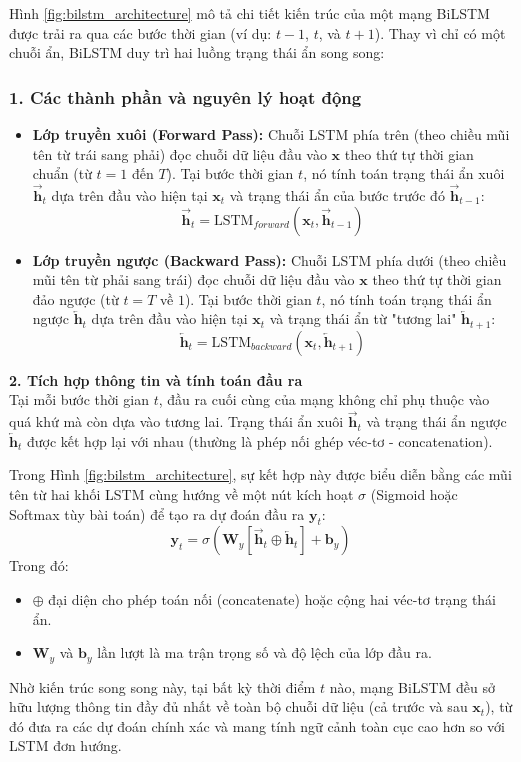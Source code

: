 Hình \ref{fig:bilstm_architecture} mô tả chi tiết kiến trúc của một mạng BiLSTM được trải ra qua các bước thời gian (ví dụ: $t-1$, $t$, và $t+1$). Thay vì chỉ có một chuỗi ẩn, BiLSTM duy trì hai luồng trạng thái ẩn song song:

\subsubsection*{1. Các thành phần và nguyên lý hoạt động}
\begin{itemize}
    \item \textbf{Lớp truyền xuôi (Forward Pass):} Chuỗi LSTM phía trên (theo chiều mũi tên từ trái sang phải) đọc chuỗi dữ liệu đầu vào $\mathbf{x}$ theo thứ tự thời gian chuẩn (từ $t=1$ đến $T$). Tại bước thời gian $t$, nó tính toán trạng thái ẩn xuôi $\overrightarrow{\mathbf{h}}_t$ dựa trên đầu vào hiện tại $\mathbf{x}_t$ và trạng thái ẩn của bước trước đó $\overrightarrow{\mathbf{h}}_{t-1}$:
    $$ \overrightarrow{\mathbf{h}}_t = \text{LSTM}_{forward}(\mathbf{x}_t, \overrightarrow{\mathbf{h}}_{t-1}) $$

    \item \textbf{Lớp truyền ngược (Backward Pass):} Chuỗi LSTM phía dưới (theo chiều mũi tên từ phải sang trái) đọc chuỗi dữ liệu đầu vào $\mathbf{x}$ theo thứ tự thời gian đảo ngược (từ $t=T$ về $1$). Tại bước thời gian $t$, nó tính toán trạng thái ẩn ngược $\overleftarrow{\mathbf{h}}_t$ dựa trên đầu vào hiện tại $\mathbf{x}_t$ và trạng thái ẩn từ "tương lai" $\overleftarrow{\mathbf{h}}_{t+1}$:
    $$ \overleftarrow{\mathbf{h}}_t = \text{LSTM}_{backward}(\mathbf{x}_t, \overleftarrow{\mathbf{h}}_{t+1}) $$
\end{itemize}

\textbf{2. Tích hợp thông tin và tính toán đầu ra} \\
Tại mỗi bước thời gian $t$, đầu ra cuối cùng của mạng không chỉ phụ thuộc vào quá khứ mà còn dựa vào tương lai. Trạng thái ẩn xuôi $\overrightarrow{\mathbf{h}}_t$ và trạng thái ẩn ngược $\overleftarrow{\mathbf{h}}_t$ được kết hợp lại với nhau (thường là phép nối ghép véc-tơ - concatenation). 

Trong Hình \ref{fig:bilstm_architecture}, sự kết hợp này được biểu diễn bằng các mũi tên từ hai khối LSTM cùng hướng về một nút kích hoạt $\sigma$ (Sigmoid hoặc Softmax tùy bài toán) để tạo ra dự đoán đầu ra $\mathbf{y}_t$:
$$ \mathbf{y}_t = \sigma(\mathbf{W}_y [\overrightarrow{\mathbf{h}}_t \oplus \overleftarrow{\mathbf{h}}_t] + \mathbf{b}_y) $$
Trong đó:
\begin{itemize}
    \item $\oplus$ đại diện cho phép toán nối (concatenate) hoặc cộng hai véc-tơ trạng thái ẩn.
    \item $\mathbf{W}_y$ và $\mathbf{b}_y$ lần lượt là ma trận trọng số và độ lệch của lớp đầu ra.
\end{itemize}

Nhờ kiến trúc song song này, tại bất kỳ thời điểm $t$ nào, mạng BiLSTM đều sở hữu lượng thông tin đầy đủ nhất về toàn bộ chuỗi dữ liệu (cả trước và sau $\mathbf{x}_t$), từ đó đưa ra các dự đoán chính xác và mang tính ngữ cảnh toàn cục cao hơn so với LSTM đơn hướng.